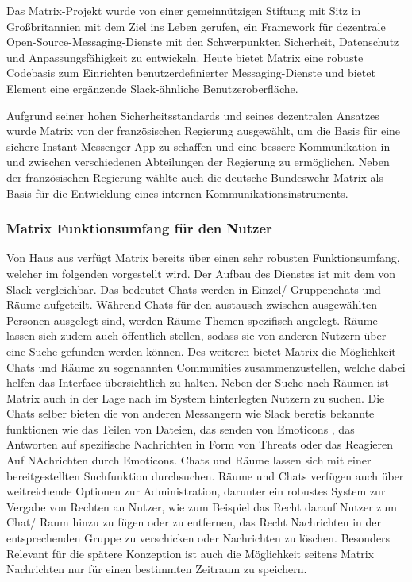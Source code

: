 Das Matrix-Projekt wurde von einer gemeinnützigen Stiftung mit Sitz in Großbritannien mit dem Ziel ins Leben gerufen, ein Framework für dezentrale Open-Source-Messaging-Dienste mit den Schwerpunkten Sicherheit, Datenschutz und Anpassungsfähigkeit zu entwickeln. Heute bietet Matrix eine robuste Codebasis zum Einrichten benutzerdefinierter Messaging-Dienste und bietet Element eine ergänzende Slack-ähnliche Benutzeroberfläche.

Aufgrund seiner hohen Sicherheitsstandards und seines dezentralen Ansatzes wurde Matrix  von der französischen Regierung ausgewählt, um die Basis für eine sichere Instant Messenger-App zu schaffen und eine bessere Kommunikation in und zwischen verschiedenen Abteilungen der Regierung zu ermöglichen. Neben der französischen Regierung wählte auch die deutsche Bundeswehr Matrix als Basis für die Entwicklung eines internen Kommunikationsinstruments.

\subsubsection{Matrix Funktionsumfang für den Nutzer}\label{chapter:aemn}
Von Haus aus verfügt Matrix bereits über einen sehr robusten Funktionsumfang, welcher im folgenden vorgestellt wird.
Der Aufbau des Dienstes ist mit dem von Slack vergleichbar. Das bedeutet Chats werden in Einzel/ Gruppenchats und Räume aufgeteilt. Während Chats für den austausch zwischen ausgewählten Personen ausgelegt sind, werden Räume Themen spezifisch angelegt. Räume lassen sich zudem auch öffentlich stellen, sodass sie von anderen Nutzern über eine Suche gefunden werden können. Des weiteren bietet Matrix die Möglichkeit Chats und Räume zu sogenannten Communities zusammenzustellen, welche dabei helfen das Interface übersichtlich zu halten.
Neben der Suche nach Räumen ist Matrix auch in der Lage nach im System hinterlegten Nutzern zu suchen. Die Chats selber bieten die von anderen Messangern wie Slack beretis bekannte funktionen wie das Teilen von Dateien, das senden von Emoticons , das Antworten auf spezifische Nachrichten in Form von Threats oder das Reagieren Auf NAchrichten durch Emoticons. Chats und Räume lassen sich mit einer bereitgestellten Suchfunktion durchsuchen. Räume und Chats verfügen auch über weitreichende Optionen zur Administration, darunter ein robustes System zur Vergabe von Rechten an Nutzer, wie zum Beispiel das Recht darauf Nutzer zum Chat/ Raum hinzu zu fügen oder zu entfernen, das Recht Nachrichten in der entsprechenden Gruppe zu verschicken oder Nachrichten zu löschen. Besonders Relevant für die spätere Konzeption ist auch die Möglichkeit seitens Matrix Nachrichten nur für einen bestimmten Zeitraum zu speichern.

